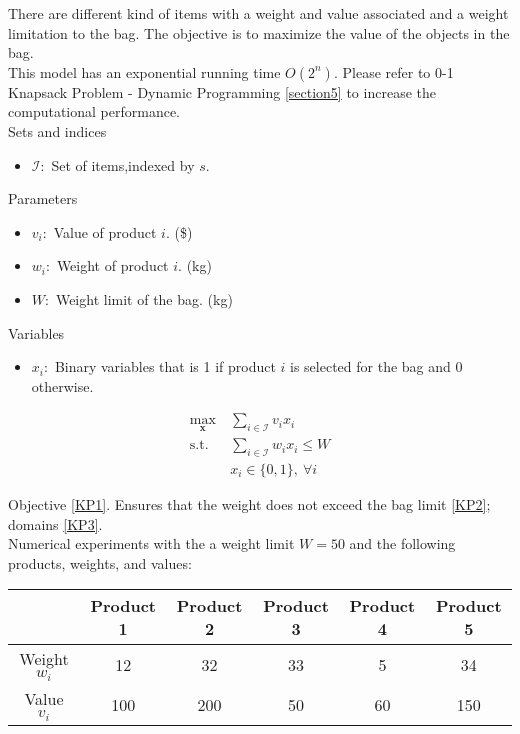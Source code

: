 \documentclass[10pt,bezier]{article}
\begin{document}
There are different kind of items with a weight and value associated and a weight limitation to the bag. The objective is to maximize the value of the objects in the bag.\\

This model has an exponential running time $O(2^n)$. Please refer to 0-1 Knapsack Problem - Dynamic Programming \ref{section5} to increase the computational performance.\\

\noindent Sets and indices
\begin{itemize}
  \item $\mathcal{I}$:~Set of items,indexed by $s$.
\end{itemize}
Parameters
\begin{itemize}
    \item $v_i$:~Value of product $i$. (\$)
    \item $w_i$:~Weight of product $i$. (kg)
    \item $W$:~Weight limit of the bag. (kg)
\end{itemize}
Variables
\begin{itemize}
  \item $x_i$:~Binary variables that is 1 if product $i$ is selected for the bag and 0 otherwise.
\end{itemize}

\begin{subequations}\label{KP}
    \begin{align}
    \max_{\pmb{x}} ~& \sum_{i \in \mathcal{I}} v_i x_i \label{KP1}\\
    \text{s.t. } & \sum_{i \in \mathcal{I}} w_i x_i \leq W \label{KP2}\\
                 & x_i \in \{0,1\},~\forall i \label{KP3}
    \end{align}
\end{subequations}

Objective \eqref{KP1}. Ensures that the weight does not exceed the bag limit \eqref{KP2}; domains \eqref{KP3}.\\

Numerical experiments with the a weight limit $W=50$ and the following products, weights, and values:
\begin{table}[!htbp]
    \centering
    \begin{tabular}{c | c c c c c }
                     & Product 1 & Product 2 & Product 3 & Product 4 & Product 5\\ \hline
        Weight $w_i$ & 12 & 32 & 33 & 5 & 34\\
        Value $v_i$ & 100 & 200 & 50 & 60 & 150
    \end{tabular}
\end{table}
\end{document}
